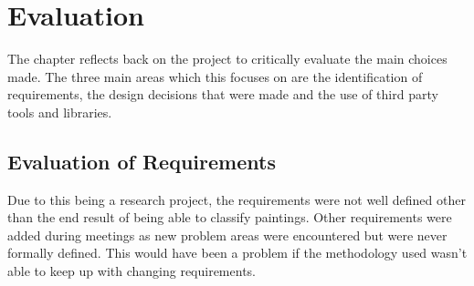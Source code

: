 \chapter{Evaluation}

The chapter reflects back on the project to critically evaluate the main choices made. The three
main areas which this focuses on are the identification of requirements, the design decisions that
were made and the use of third party tools and libraries.





\section{Evaluation of Requirements}
Due to this being a research project, the requirements were not well defined other than the end 
result of being able to classify paintings. Other requirements were added during meetings as new
problem areas were encountered but were never formally defined. This would have been a problem if 
the methodology used wasn't able to keep up with changing requirements.

